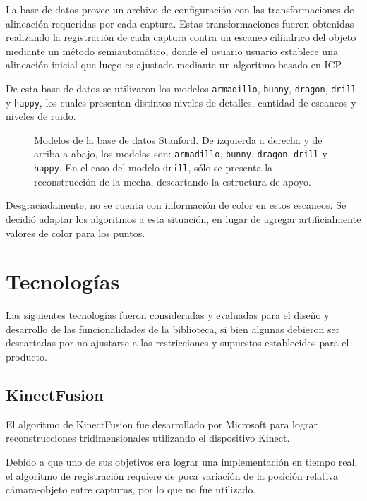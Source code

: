 La base de datos provee un archivo de configuración con las transformaciones de
alineación requeridas por cada captura.
Estas transformaciones fueron obtenidas realizando la registración de cada captura
contra un escaneo cilíndrico del objeto mediante un método semiautomático, donde el usuario
usuario establece una alineación inicial que luego es ajustada mediante un algoritmo
basado en ICP\cite{Turk:1994:ZPM:192161.192241}.

De esta base de datos se utilizaron los modelos
	\texttt{armadillo},
	\texttt{bunny},
	\texttt{dragon},
	\texttt{drill} y
	\texttt{happy},
los cuales presentan distintos niveles de detalles, cantidad de escaneos y niveles de ruido.


\begin{figure}
	\caption[Modelos de la base de datos Stanford]{\label{fig:stanford_models}Modelos de la base de datos Stanford.
		De izquierda a derecha y de arriba a abajo, los modelos son:
		\texttt{armadillo},
		\texttt{bunny},
		\texttt{dragon},
		\texttt{drill}
		y \texttt{happy}.
		En el caso del modelo \texttt{drill}, sólo se presenta la reconstrucción de la mecha, descartando la estructura de apoyo.}
\end{figure}


Desgraciadamente, no se cuenta con información de color en estos escaneos.
Se decidió adaptar los algoritmos a esta situación, en lugar de agregar
artificialmente valores de color para los puntos.


\section{Tecnologías}
Las siguientes tecnologías fueron consideradas y evaluadas
para el diseño y desarrollo de las funcionalidades de la biblioteca,
si bien algunas debieron ser descartadas por no ajustarse a las restricciones
y supuestos establecidos para el producto.

	\subsection{KinectFusion}
El algoritmo de KinectFusion fue desarrollado por Microsoft
para lograr reconstrucciones tridimensionales utilizando el dispositivo Kinect.

	Debido a que uno de sus objetivos era lograr una implementación en tiempo
	real, el algoritmo de registración requiere de poca variación
	de la posición relativa cámara-objeto entre capturas, por lo que no fue utilizado.

